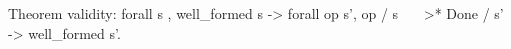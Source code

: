 Theorem validity:
  forall s      , well_formed s -> 
  forall op s', op / s ~~~>* Done / s' ->
                    well_formed s'.